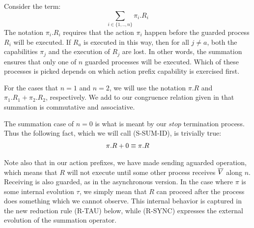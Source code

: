Consider the term:
\[
	\sum_{i\in \{1,..,n\}} \pi_i.R_i
\]
The notation $\pi_i.R_i$ requires that the action $\pi_i$ happen before the guarded process $R_i$ will be executed.  If $R_a$ is executed in this way, then for all $j \neq a$, both the capabilities $\pi_j$ and the execution of $R_j$ are lost.  In other words, the summation ensures that only one of $n$ guarded processes will be executed. Which of these processes is picked depends on which action prefix capability is exercised first. 

For the cases that $n=1$ and $n=2$, we will use the notation $\pi.R$ and $\pi_1.R_1 + \pi_2.R_2$, respectively.  We add to our congruence relation given in  that summation is commutative and associative.

The summation case of $n=0$ is what is meant by our $stop$ termination process.  Thus the following fact, which we will call (S-SUM-ID), is trivially true:
\begin{align*}
	\pi.R + 0 \equiv \pi.R
\end{align*}

Note also that in our action prefixes, we have made sending aguarded operation, which means that $R$ will not execute until some other process receives $\overline{V}$ along $n$.   Receiving is also guarded, as in the asynchronous version.  In the case where $\pi$ is some internal evolution $\tau$, we simply mean that $R$ can proceed after the process does something which we cannot observe.  This internal behavior is captured in the new reduction rule (R-TAU) below, while (R-SYNC) expresses the external evolution of the summation operator.


